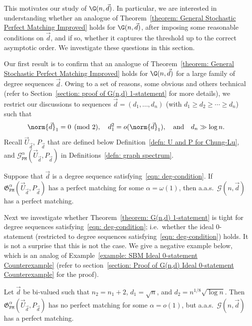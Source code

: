 \documentclass[12pt]{article}
\begin{document}
This motivates our study of $\G(n,\vec{d})$. In particular, we are interested in understanding whether an analogue of Theorem~\ref{theorem: General Stochastic Perfect Matching Improved} holds for  $\G(n,\vec{d})$, after imposing some reasonable conditions on $\vec{d}$, and if so, whether it captures the threshold up to the correct asymptotic order. We investigate these questions in this section. 

Our first result is to confirm that an analogue of Theorem~\ref{theorem: General Stochastic Perfect Matching Improved} holds for  $\G(n,\vec{d})$ for a large family of degree sequences $\vec{d}$.  Owing to a set of reasons, some obvious and others technical (refer to Section~\ref{section: proof of G(n,d) 1-statement} for more details), we restrict our discussions to sequences $\vec{d} = (d_1,\ldots,d_n)$ (with $d_1\geq d_2\geq\cdots \ge d_n$) such that 
\begin{equation}\label{eqn: deg-condition}
    \norm{\vec{d}}_1=0\pmod{2},\quad d_1^2 = o(\norm{\vec{d}}_1),\quad \text{and}\quad d_n\gg\log n.
\end{equation}
Recall $\vec{U}_{\vec{d}}$, $P_{\vec{d}}$ that are defined below Definition~\ref{defn: U and P for Chung-Lu}, and $\mathcal{G}_{\texttt{PM}}^{\alpha}(\vec{U}_{\vec{d}}, P_{\vec{d}})$ in Definitions~\ref{defn: graph spectrum}.
\begin{theorem}
\label{theorem: G(n,d) 1-statement}
Suppose that $\vec{d}$ is a degree sequence satisfying~\eqref{eqn: deg-condition}. If $\mathfrak{G}_{\texttt{PM}}^{\alpha}(\vec{U}_{\vec{d}}, P_{\vec{d}})$ has a perfect matching for some $\alpha = \omega(1)$, then a.a.s.\ $\mathcal{G}(n,\vec{d})$ has a perfect matching. 
\end{theorem}

Next 
we investigate whether Theorem~\ref{theorem: G(n,d) 1-statement} is tight for degree sequences satisfying~\eqref{eqn: deg-condition}; i.e.\ whether the ideal 0-statement (restricted to degree sequences satisfying~\eqref{eqn: deg-condition}) holds. It is not a surprise that this is not the case. We give a negative example below, which is an analog of Example~\ref{example: SBM Ideal 0-statement Counterexample} (refer to section~\ref{section: Proof of G(n,d) Ideal 0-statement Counterexample} for the proof). 

\begin{example}
\label{example: G(n,d) Ideal 0-statement Counterexample}
Let $\vec{d}$ be bi-valued such that $n_2 = n_1 + 2$, $d_1 = \sqrt{n}$, and $d_2 = n^{1/8}\sqrt{\log n}$. Then $\mathfrak{G}_{\texttt{PM}}^{\alpha}(\vec{U}_{\vec{d}}, P_{\vec{d}})$ has no perfect matching for some $\alpha = o(1)$, but a.a.s.\ $\mathcal{G}(n,\vec{d})$ has a perfect matching. 
   
\end{example}
\end{document}
